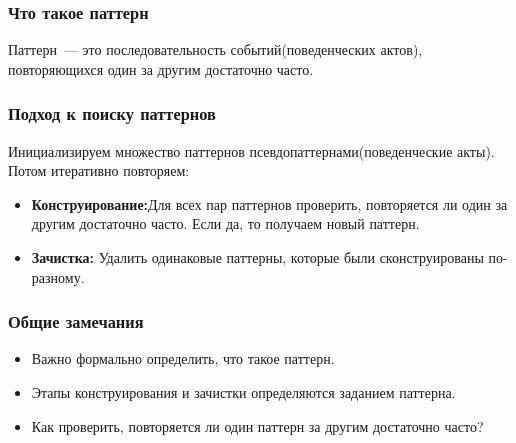 \documentclass[smaller]{beamer}
\begin{document}

\begin{frame}	
  \frametitle{Что такое паттерн}
Паттерн~--- это последовательность событий(поведенческих актов), повторяющихся один за другим 
достаточно часто.
\end{frame}

\begin{frame}	
  \frametitle{Подход к поиску паттернов}
  Инициализируем множество паттернов псевдопаттернами(поведенческие акты). Потом итеративно повторяем:
  \begin{itemize}
   \item {\bf Конструирование:}Для всех пар паттернов проверить, повторяется ли один за другим достаточно часто. Если да, 
	то получаем новый паттерн. 
   \item {\bf Зачистка:} Удалить одинаковые паттерны, которые были сконструированы по-разному.
  \end{itemize}
\end{frame}

\begin{frame}	
  \frametitle{Общие замечания}
  \begin{itemize}
   \item Важно формально определить, что такое паттерн.
   \item Этапы конструирования и зачистки определяются заданием паттерна.
   \item Как проверить, повторяется ли один паттерн за другим достаточно часто?
  \end{itemize}
\end{frame}
\end{document}
